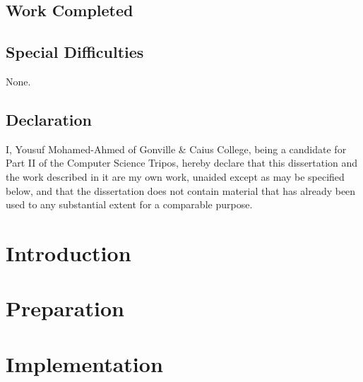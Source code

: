 \documentclass[12pt,twoside,notitlepage]{report}
\begin{document}
\section*{Work Completed}


\section*{Special Difficulties}
None.
 
\newpage
\section*{Declaration}

I, Yousuf Mohamed-Ahmed of Gonville \& Caius College, being a candidate for Part II of the Computer
Science Tripos, hereby declare
that this dissertation and the work described in it are my own work,
unaided except as may be specified below, and that the dissertation
does not contain material that has already been used to any substantial
extent for a comparable purpose.

\bigskip
{}

\medskip
{}

\cleardoublepage

\tableofcontents

\newpage


\cleardoublepage        %

\setcounter{page}{1}
\pagestyle{headings}

\chapter{Introduction}

\cleardoublepage

\chapter{Preparation}

\cleardoublepage

\chapter{Implementation}

\cleardoublepage
\end{document}
